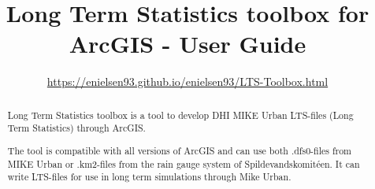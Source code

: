\documentclass[a4paper,11pt]{refart}
\title{Long Term Statistics toolbox for ArcGIS - User Guide}
\date{\url{https://enielsen93.github.io/enielsen93/LTS-Toolbox.html}}
\begin{document}
	\maketitle
	
	\begin{abstract}
	Long Term Statistics toolbox is a tool to develop DHI MIKE Urban LTS-files (Long Term Statistics) through ArcGIS.
	
	The tool is compatible with all versions of ArcGIS and can use both .dfs0-files from MIKE Urban or .km2-files from the rain gauge system of Spildevandskomitéen. It can write LTS-files for use in long term simulations through Mike Urban. 
	\end{abstract}
	
	\tableofcontents
	\clearpage
	
%	
%	
%	
	
	
\end{document}
